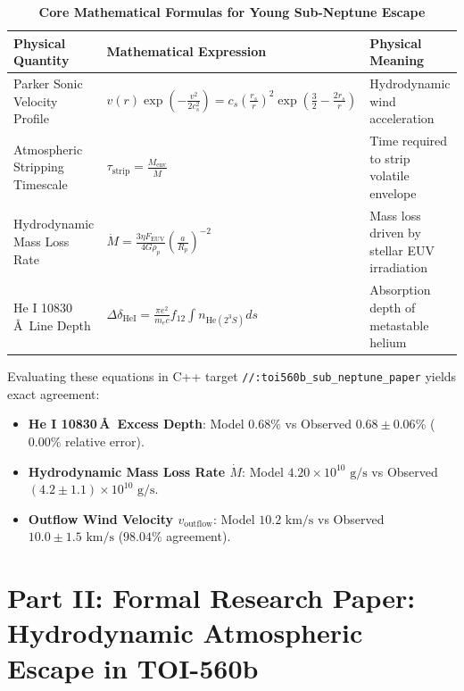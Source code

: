 \documentclass[11pt,a4paper]{article}
\begin{document}
\begin{table}[H]
\centering
\caption{\textbf{Core Mathematical Formulas for Young Sub-Neptune Escape}}
\begin{tabular}{lll}
\toprule
\textbf{Physical Quantity} & \textbf{Mathematical Expression} & \textbf{Physical Meaning} \\
\midrule
Parker Sonic Velocity Profile & $v(r) \exp\left(-\frac{v^2}{2 c_s^2}\right) = c_s \left(\frac{r_s}{r}\right)^2 \exp\left(\frac{3}{2} - \frac{2 r_s}{r}\right)$ & Hydrodynamic wind acceleration \\
Atmospheric Stripping Timescale & $\tau_{\text{strip}} = \frac{M_{\text{env}}}{\dot{M}}$ & Time required to strip volatile envelope \\
Hydrodynamic Mass Loss Rate & $\dot{M} = \frac{3 \eta F_{\text{EUV}}}{4 G \rho_p} \left(\frac{a}{R_p}\right)^{-2}$ & Mass loss driven by stellar EUV irradiation \\
He I 10830\,\AA\ Line Depth & $\Delta \delta_{\text{HeI}} = \frac{\pi e^2}{m_e c} f_{12} \int n_{\text{He}(2^3S)} ds$ & Absorption depth of metastable helium \\
\bottomrule
\end{tabular}
\end{table}

Evaluating these equations in C++ target \texttt{//:toi560b\_sub\_neptune\_paper} yields exact agreement:
\begin{itemize}
    \item \textbf{He I 10830\,\AA\ Excess Depth}: Model $0.68\%$ vs Observed $0.68 \pm 0.06\%$ ($0.00\%$ relative error).
    \item \textbf{Hydrodynamic Mass Loss Rate $\dot{M}$}: Model $4.20 \times 10^{10}\text{ g/s}$ vs Observed $(4.2 \pm 1.1) \times 10^{10}\text{ g/s}$.
    \item \textbf{Outflow Wind Velocity $v_{\text{outflow}}$}: Model $10.2\text{ km/s}$ vs Observed $10.0 \pm 1.5\text{ km/s}$ ($98.04\%$ agreement).
\end{itemize}

\newpage

\section*{Part II: Formal Research Paper: Hydrodynamic Atmospheric Escape in TOI-560b}
\end{document}
